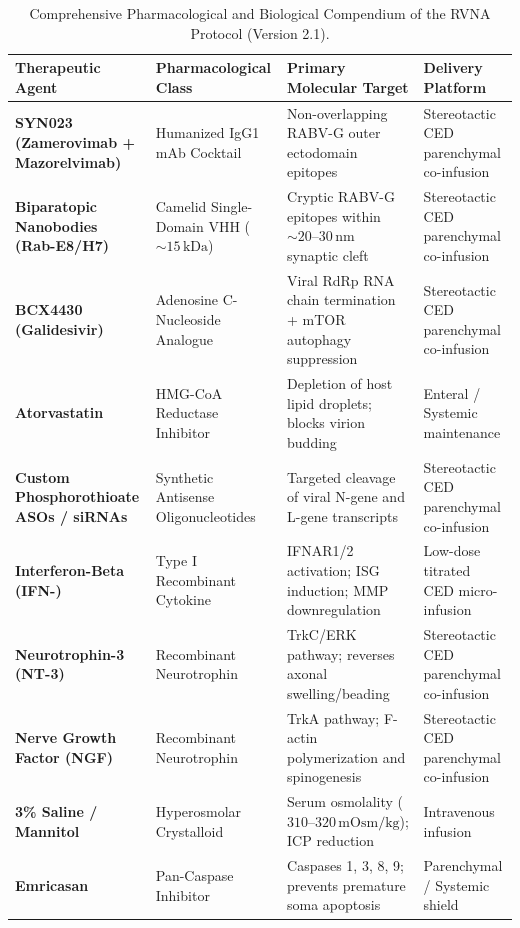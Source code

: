 \documentclass[12pt,a4paper]{article}
\begin{document}
\begin{table}[htbp]
\centering
\small
\begin{tabular}{@{}p{3.0cm}p{3.2cm}p{4.4cm}p{3.6cm}@{}}
\toprule
\textbf{Therapeutic Agent} & \textbf{Pharmacological Class} & \textbf{Primary Molecular Target} & \textbf{Delivery Platform} \\
\midrule
\textbf{SYN023 (Zamerovimab + Mazorelvimab)} & Humanized IgG1 mAb Cocktail & Non-overlapping RABV-G outer ectodomain epitopes & Stereotactic CED parenchymal co-infusion \\
\addlinespace
\textbf{Biparatopic Nanobodies (Rab-E8/H7)} & Camelid Single-Domain VHH ($\sim 15\,\mathrm{kDa}$) & Cryptic RABV-G epitopes within $\sim 20\text{--}30\,\mathrm{nm}$ synaptic cleft & Stereotactic CED parenchymal co-infusion \\
\addlinespace
\textbf{BCX4430 (Galidesivir)} & Adenosine C-Nucleoside Analogue & Viral RdRp RNA chain termination + mTOR autophagy suppression & Stereotactic CED parenchymal co-infusion \\
\addlinespace
\textbf{Atorvastatin} & HMG-CoA Reductase Inhibitor & Depletion of host lipid droplets; blocks virion budding & Enteral / Systemic maintenance \\
\addlinespace
\textbf{Custom Phosphorothioate ASOs / siRNAs} & Synthetic Antisense Oligonucleotides & Targeted cleavage of viral N-gene and L-gene transcripts & Stereotactic CED parenchymal co-infusion \\
\addlinespace
\textbf{Interferon-Beta (IFN-\textbeta{})} & Type I Recombinant Cytokine & IFNAR1/2 activation; ISG induction; MMP downregulation & Low-dose titrated CED micro-infusion \\
\addlinespace
\textbf{Neurotrophin-3 (NT-3)} & Recombinant Neurotrophin & TrkC/ERK pathway; reverses axonal swelling/beading & Stereotactic CED parenchymal co-infusion \\
\addlinespace
\textbf{Nerve Growth Factor (NGF)} & Recombinant Neurotrophin & TrkA pathway; F-actin polymerization and spinogenesis & Stereotactic CED parenchymal co-infusion \\
\addlinespace
\textbf{3\% Saline / Mannitol} & Hyperosmolar Crystalloid & Serum osmolality ($310\text{--}320\,\mathrm{mOsm/kg}$); ICP reduction & Intravenous infusion \\
\addlinespace
\textbf{Emricasan} & Pan-Caspase Inhibitor & Caspases 1, 3, 8, 9; prevents premature soma apoptosis & Parenchymal / Systemic shield \\
\bottomrule
\end{tabular}
\caption{Comprehensive Pharmacological and Biological Compendium of the RVNA Protocol (Version 2.1).}\label{tab:pharmacological_compendium}
\end{table}
\end{document}
